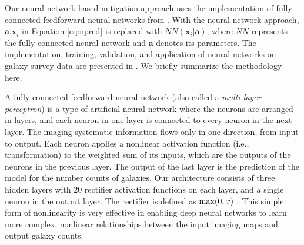 Our neural network-based mitigation approach uses the implementation of fully connected feedforward neural networks from \cite{rezaie2021primordial}. With the neural network approach, $\textbf{a}.\textbf{x}_{i}$ in Equation \ref{eq:npred} is replaced with $NN(\textbf{x}_{i}|\textbf{a})$, where $NN$ represents the fully connected neural network and $\textbf{a}$ denotes its parameters. The implementation, training, validation, and application of neural networks on galaxy survey data are presented in \cite{rezaie2021primordial}. We briefly summarize the methodology here. 

A fully connected feedforward neural network (also called a \textit{multi-layer perceptron}) is a type of artificial neural network where the neurons are arranged in layers, and each neuron in one layer is connected to every neuron in the next layer. The imaging systematic information flows only in one direction, from input to output. Each neuron applies a nonlinear activation function (i.e., transformation) to the weighted sum of its inputs, which are the outputs of the neurons in the previous layer. The output of the last layer is the prediction of the model for the number counts of galaxies. Our architecture consists of three hidden layers with 20 rectifier activation functions on each layer, and a single neuron in the output layer. The rectifier is defined as ${\rm max}(0, x)$ \citep{nair2010rectified}. This simple form of nonlinearity is very effective in enabling deep neural networks to learn more complex, nonlinear relationships between the input imaging maps and output galaxy counts.

